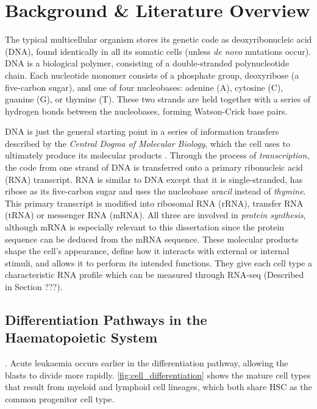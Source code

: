 \chapter{Background \& Literature Overview}
\label{lit review}

The typical multicellular organism stores its genetic code as deoxyribonucleic acid (DNA), found identically in all its somatic cells (unless \textit{de novo} mutations occur). DNA is a biological polymer, consisting of a double-stranded polynucleotide chain. Each nucleotide monomer consists of a phosphate group, deoxyribose (a five-carbon sugar), and one of four nucleobases: adenine (A), cytosine (C), guanine (G), or thymine (T). These two strands are held together with a series of hydrogen bonds between the nucleobases, forming Watson-Crick base pairs. %

DNA is just the general starting point in a series of information transfers described by the \textit{Central Dogma of Molecular Biology}, which the cell uses to ultimately produce its molecular products \citep{cobb201760}. Through the process of \textit{transcription}, the code from one strand of DNA is transferred onto a primary ribonucleic acid (RNA) transcript. RNA is similar to DNA except that it is single-stranded, has ribose as its five-carbon sugar and uses the nucleobase \textit{uracil} instead of \textit{thymine}. This primary transcript is modified into ribosomal RNA (rRNA), transfer RNA (tRNA) or messenger RNA (mRNA). All three are involved in \textit{protein synthesis}, although mRNA is especially relevant to this dissertation since the protein sequence can be deduced from the mRNA sequence. These molecular products shape the cell's appearance, define how it interacts with external or internal stimuli, and allows it to perform its intended functions. They give each cell type a characteristic RNA profile which can be measured through RNA-seq (Described in Section ???).


\section{Differentiation Pathways in the Haematopoietic System}
. Acute leukaemia occurs earlier in the differentiation pathway, allowing the blasts to divide more rapidly. \autoref{fig:cell_differentiation} shows the mature cell types that result from myeloid and lymphoid cell lineages, which both share \ac{HSC} as the common progenitor cell type.

